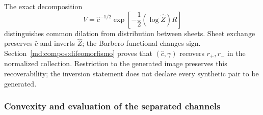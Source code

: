 The exact decomposition
\begin{equation}
 V=\widehat c^{-1/2}
 \exp\!\left[-\frac12(\log\widehat Z)R\right]
 \label{md:hib:descomposicion-v}
\end{equation}
distinguishes common dilation from distribution between sheets. Sheet
exchange preserves $\widehat c$ and inverts $\widehat Z$; the Barbero
functional changes sign. Section~\ref{md:compos:difeomorfismo} proves that
$(\widehat c,\gamma)$ recovers $r_+,r_-$ in the normalized collection.
Restriction to the generated image preserves this recoverability; the
inversion statement does not declare every synthetic pair to be generated.

\subsubsection{Convexity and evaluation of the separated channels}
\label{md:hib:convexidad}

